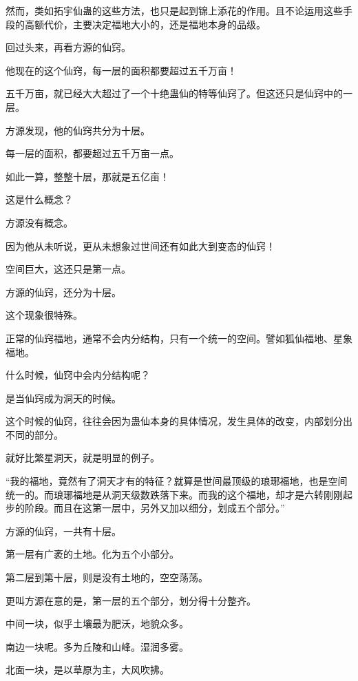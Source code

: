 
\begin{this_body}



然而，类如拓宇仙蛊的这些方法，也只是起到锦上添花的作用。且不论运用这些手段的高额代价，主要决定福地大小的，还是福地本身的品级。

回过头来，再看方源的仙窍。

他现在的这个仙窍，每一层的面积都要超过五千万亩！

五千万亩，就已经大大超过了一个十绝蛊仙的特等仙窍了。但这还只是仙窍中的一层。

方源发现，他的仙窍共分为十层。

每一层的面积，都要超过五千万亩一点。

如此一算，整整十层，那就是五亿亩！

这是什么概念？

方源没有概念。

因为他从未听说，更从未想象过世间还有如此大到变态的仙窍！

空间巨大，这还只是第一点。

方源的仙窍，还分为十层。

这个现象很特殊。

正常的仙窍福地，通常不会内分结构，只有一个统一的空间。譬如狐仙福地、星象福地。

什么时候，仙窍中会内分结构呢？

是当仙窍成为洞天的时候。

这个时候的仙窍，往往会因为蛊仙本身的具体情况，发生具体的改变，内部划分出不同的部分。

就好比繁星洞天，就是明显的例子。

“我的福地，竟然有了洞天才有的特征？就算是世间最顶级的琅琊福地，也是空间统一的。而琅琊福地是从洞天级数跌落下来。而我的这个福地，却才是六转刚刚起步的阶段。而且在这第一层中，另外又加以细分，划成五个部分。”

方源的仙窍，一共有十层。

第一层有广袤的土地。化为五个小部分。

第二层到第十层，则是没有土地的，空空荡荡。

更叫方源在意的是，第一层的五个部分，划分得十分整齐。

中间一块，似乎土壤最为肥沃，地貌众多。

南边一块呢。多为丘陵和山峰。湿润多雾。

北面一块，是以草原为主，大风吹拂。


\end{this_body}
